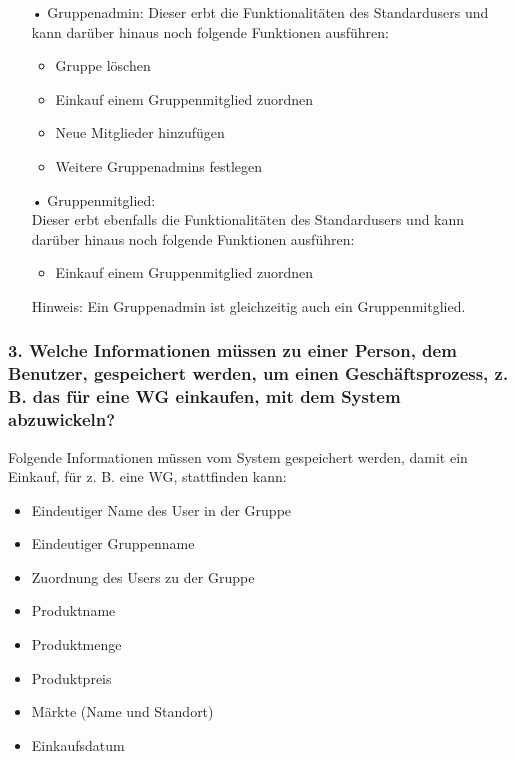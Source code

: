 \documentclass[12pt,a4paper]{article}
\begin{document}
\begin{itemize}
\item[•]Gruppenadmin:
\newline
Dieser erbt die Funktionalitäten des Standardusers und kann darüber hinaus noch folgende Funktionen ausführen:
\begin{itemize}
\item Gruppe löschen
\item Einkauf einem Gruppenmitglied zuordnen
\item Neue Mitglieder hinzufügen
\item Weitere Gruppenadmins festlegen
\end{itemize}
\end{itemize}

\begin{itemize}
\item[•] Gruppenmitglied:
\\
Dieser erbt ebenfalls die Funktionalitäten des Standardusers und kann darüber hinaus noch folgende Funktionen ausführen:
\begin{itemize}
\item Einkauf einem Gruppenmitglied zuordnen
\end{itemize}
Hinweis: Ein Gruppenadmin ist gleichzeitig auch ein Gruppenmitglied.
\end{itemize}

\subsubsection*{3. Welche Informationen müssen zu einer Person, dem Benutzer, gespeichert werden, um einen Geschäftsprozess, z. B. das für eine WG einkaufen, mit dem System abzuwickeln?}
Folgende Informationen müssen vom System gespeichert werden, damit ein Einkauf, für z. B. eine WG, stattfinden kann:
\begin{itemize} 
\item Eindeutiger Name des User in der Gruppe %
\item Eindeutiger Gruppenname %
\item Zuordnung des Users zu der Gruppe %
\item Produktname
\item Produktmenge
\item Produktpreis
\item Märkte (Name und Standort)
\item Einkaufsdatum
\end{itemize}
 
\end{document}
